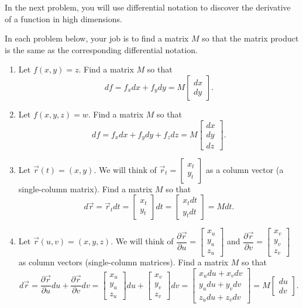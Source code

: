 In the next problem, you will use differential notation to discover the derivative of a function in high dimensions.
\begin{problem}\label{derive matrix derivative}%
In each problem below, your job is to find a matrix $M$ so that the matrix product is the same as the corresponding differential notation. 
\begin{enumerate}
 \item  Let $f(x,y)=z$. Find a matrix $M$ so that 
$$df=f_xdx+f_ydy=M\begin{bmatrix}dx\\dy\end{bmatrix}.$$
 \item  Let $f(x,y,z)=w$. Find a matrix $M$ so that 
$$df=f_xdx+f_ydy+f_zdz=M\begin{bmatrix}dx\\dy\\dz\end{bmatrix}.$$
 \item  Let $\vec r(t)=(x,y)$. We will think of $\vec r_t=\begin{bmatrix}x_t\\y_t\end{bmatrix}$ as a column vector (a single-column matrix).  Find a matrix $M$ so that 
$$d\vec r=\vec r_t dt=\begin{bmatrix}x_t\\y_t\end{bmatrix}dt=\begin{bmatrix}x_tdt\\y_tdt\end{bmatrix}=Mdt.$$
 \item  Let $\vec r(u,v)=(x,y,z)$. We will think of $\dfrac{\partial \vec r}{\partial u}=\begin{bmatrix}x_u\\y_u\\z_u\end{bmatrix}$ and $\dfrac{\partial \vec r}{\partial v}=\begin{bmatrix}x_v\\y_v\\z_v\end{bmatrix}$ as column vectors (single-column matrices).  Find a matrix $M$ so that 
$$d\vec r=\frac{\partial \vec r}{\partial u}du+\frac{\partial \vec r}{\partial v}dv=\begin{bmatrix}x_u\\y_u\\z_u\end{bmatrix}du+\begin{bmatrix}x_v\\y_v\\z_v\end{bmatrix}dv=\begin{bmatrix}x_udu+ x_vdv\\y_udu +y_vdv\\z_udu+z_vdv\end{bmatrix}=M\begin{bmatrix}du\\dv\end{bmatrix}.$$

\end{enumerate}
\end{problem}
